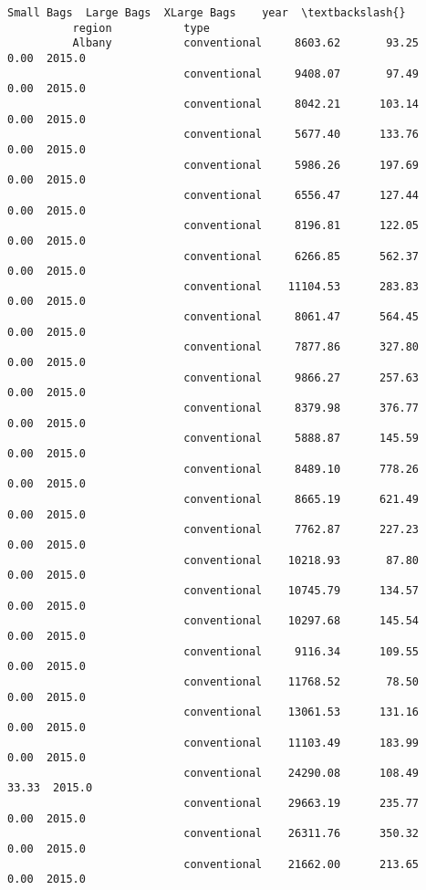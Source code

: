 \documentclass[11pt]{article}
\begin{document}
\begin{Verbatim}[commandchars=\\\{\}]
                                         Small Bags  Large Bags  XLarge Bags    year  \textbackslash{}
          region           type                                                        
          Albany           conventional     8603.62       93.25         0.00  2015.0   
                           conventional     9408.07       97.49         0.00  2015.0   
                           conventional     8042.21      103.14         0.00  2015.0   
                           conventional     5677.40      133.76         0.00  2015.0   
                           conventional     5986.26      197.69         0.00  2015.0   
                           conventional     6556.47      127.44         0.00  2015.0   
                           conventional     8196.81      122.05         0.00  2015.0   
                           conventional     6266.85      562.37         0.00  2015.0   
                           conventional    11104.53      283.83         0.00  2015.0   
                           conventional     8061.47      564.45         0.00  2015.0   
                           conventional     7877.86      327.80         0.00  2015.0   
                           conventional     9866.27      257.63         0.00  2015.0   
                           conventional     8379.98      376.77         0.00  2015.0   
                           conventional     5888.87      145.59         0.00  2015.0   
                           conventional     8489.10      778.26         0.00  2015.0   
                           conventional     8665.19      621.49         0.00  2015.0   
                           conventional     7762.87      227.23         0.00  2015.0   
                           conventional    10218.93       87.80         0.00  2015.0   
                           conventional    10745.79      134.57         0.00  2015.0   
                           conventional    10297.68      145.54         0.00  2015.0   
                           conventional     9116.34      109.55         0.00  2015.0   
                           conventional    11768.52       78.50         0.00  2015.0   
                           conventional    13061.53      131.16         0.00  2015.0   
                           conventional    11103.49      183.99         0.00  2015.0   
                           conventional    24290.08      108.49        33.33  2015.0   
                           conventional    29663.19      235.77         0.00  2015.0   
                           conventional    26311.76      350.32         0.00  2015.0   
                           conventional    21662.00      213.65         0.00  2015.0   

\end{Verbatim}
\end{document}
